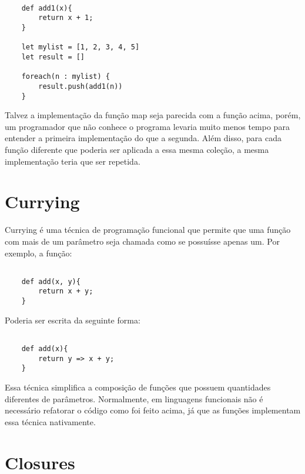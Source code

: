\begin{lstlisting}[caption={Exemplo sem Funções de Alta Ordem},label=nohof]

    def add1(x){
        return x + 1;
    }

    let mylist = [1, 2, 3, 4, 5]
    let result = []

    foreach(n : mylist) {
        result.push(add1(n))
    }

\end{lstlisting}

Talvez a implementação da função map seja parecida 
com a função acima, porém, um programador que não 
conhece o programa levaria muito menos tempo para 
entender a primeira implementação do que a segunda. 
Além disso, para cada função diferente que poderia 
ser aplicada a essa mesma coleção, a mesma 
implementação teria que ser repetida.




\section{Currying}

Currying é uma técnica de programação funcional que 
permite que uma função com mais de um parâmetro seja 
chamada como se possuísse apenas um\cite{realworldhaskell, functionalscala}. 
Por exemplo, a função:

\begin{lstlisting}[caption={Exemplo sem Currying},label=nocurrex]

    def add(x, y){
        return x + y;
    }

\end{lstlisting}

Poderia ser escrita da seguinte forma:

\begin{lstlisting}[caption={Exemplo de Currying},label=currex]

    def add(x){
        return y => x + y;
    }

\end{lstlisting}

Essa técnica simplifica a composição de funções 
que possuem quantidades diferentes de parâmetros. 
Normalmente, em linguagens funcionais não é 
necessário refatorar o código como foi feito 
acima, já que as funções implementam essa técnica 
nativamente\cite{realworldhaskell}.



\section{Closures}

